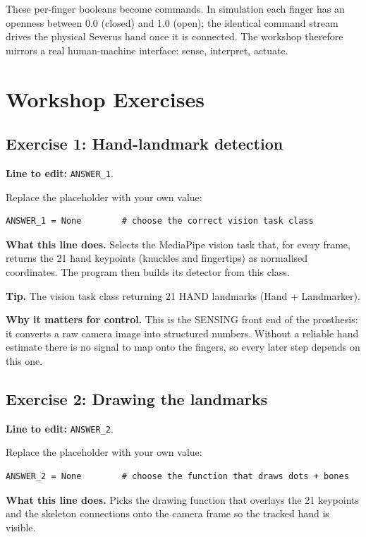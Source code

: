 \documentclass[conference]{IEEEtran}
\begin{document}
These per-finger booleans become commands. In simulation each finger has an openness between 0.0 (closed) and 1.0 (open); the identical command stream drives the physical Severus hand once it is connected. The workshop therefore mirrors a real human-machine interface: sense, interpret, actuate.

\section{Workshop Exercises}

\subsection{Exercise 1: Hand-landmark detection}

\textbf{Line to edit:} \lstinline!ANSWER_1!.

Replace the placeholder with your own value:

\begin{lstlisting}
ANSWER_1 = None        # choose the correct vision task class
\end{lstlisting}


\textbf{What this line does.} Selects the MediaPipe vision task that, for every frame, returns the 21 hand keypoints (knuckles and fingertips) as normalised coordinates. The program then builds its detector from this class.

\textbf{Tip.} The vision task class returning 21 HAND landmarks (Hand + Landmarker).

\textbf{Why it matters for control.} This is the SENSING front end of the prosthesis: it converts a raw camera image into structured numbers. Without a reliable hand estimate there is no signal to map onto the fingers, so every later step depends on this one.

\subsection{Exercise 2: Drawing the landmarks}

\textbf{Line to edit:} \lstinline!ANSWER_2!.

Replace the placeholder with your own value:

\begin{lstlisting}
ANSWER_2 = None        # choose the function that draws dots + bones
\end{lstlisting}


\textbf{What this line does.} Picks the drawing function that overlays the 21 keypoints and the skeleton connections onto the camera frame so the tracked hand is visible.
\end{document}
